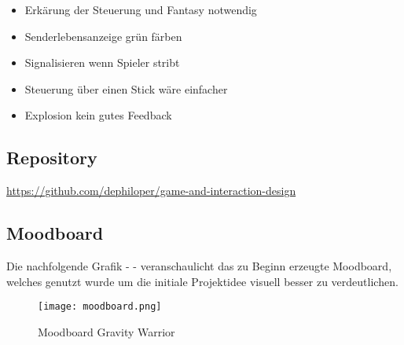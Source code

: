 \documentclass[11pt]{scrartcl}
\begin{document}
\begin{itemize}
\setlength{\parskip}{0pt}
\item Erkärung der Steuerung und Fantasy notwendig
\item Senderlebensanzeige grün färben
\item Signalisieren wenn Spieler stribt
\item Steuerung über einen Stick wäre einfacher
\item Explosion kein gutes Feedback
\end{itemize}

\newpage
\subsection{Repository}
\url{https://github.com/dephiloper/game-and-interaction-design}
\subsection{Moodboard}
Die nachfolgende Grafik -  - veranschaulicht das zu Beginn erzeugte Moodboard, welches genutzt wurde um die initiale Projektidee visuell besser zu verdeutlichen.

\begin{figure}[htp]
	\centering
	\texttt{[image: moodboard.png]}
	\caption{Moodboard Gravity Warrior}
	\label{fig:mood-board}
\end{figure}

\newpage


\newpage
\listoffigures 
\listoftables 
\end{document}

